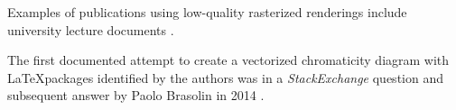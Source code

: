 \documentclass[11pt]{scrbook}
\begin{document}

Examples of publications using low-quality rasterized renderings include university lecture documents \cite{univie2020chromaticity}.

The first documented attempt to create a vectorized chromaticity diagram with \LaTeX packages identified by the authors was in a \textit{StackExchange} question and subsequent answer by Paolo Brasolin in 2014 \cite{brasolin2014stackexchange}.



\printbibliography

\end{document}
